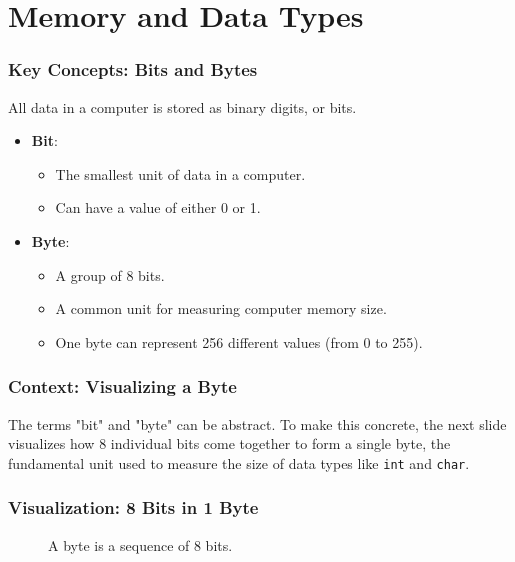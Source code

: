 \documentclass{beamer}
\begin{document}
\section{Memory and Data Types}

\begin{frame}
\frametitle{Key Concepts: Bits and Bytes}
All data in a computer is stored as binary digits, or bits.

\begin{itemize}
    \item \textbf{Bit}:
    \begin{itemize}
        \item The smallest unit of data in a computer.
        \item Can have a value of either \alert{0} or \alert{1}.
    \end{itemize}
    \pause
    \item \textbf{Byte}:
    \begin{itemize}
        \item A group of \alert{8 bits}.
        \item A common unit for measuring computer memory size.
        \item One byte can represent 256 different values (from 0 to 255).
    \end{itemize}
\end{itemize}
\end{frame}

\begin{frame}
\frametitle{Context: Visualizing a Byte}
The terms "bit" and "byte" can be abstract. To make this concrete, the next slide visualizes how 8 individual bits come together to form a single byte, the fundamental unit used to measure the size of data types like \texttt{int} and \texttt{char}.
\end{frame}

\begin{frame}
\frametitle{Visualization: 8 Bits in 1 Byte}
\centering
\begin{figure}
\centering
{}
\caption{A byte is a sequence of 8 bits.}
\end{figure}
\end{frame}
\end{document}
